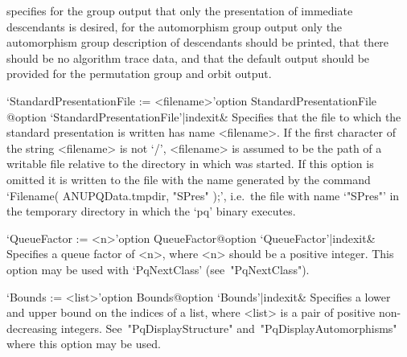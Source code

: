specifies for the group output that only the  presentation  of  immediate
descendants is desired,  for  the  automorphism  group  output  only  the
automorphism group description of descendants  should  be  printed,  that
there should be no algorithm trace data,  and  that  the  default  output
should be provided for the permutation group and orbit output.

\>`StandardPresentationFile := <filename>'{option StandardPresentationFile}%
@{option `StandardPresentationFile'|indexit}&
Specifies that the file to which the standard presentation is written has
name <filename>. If the first character of the string <filename>  is  not
`/', <filename> is assumed to be the path of a writable file relative  to
the directory in which {\GAP} was started. If this option is  omitted  it
is written to the file with the name generated by the command  `Filename(
ANUPQData.tmpdir, "SPres" );', i.e.~the file with name `"SPres"'  in  the
temporary directory in which the `pq' binary executes.

\>`QueueFactor := <n>'{option QueueFactor}@{option `QueueFactor'|indexit}&
Specifies a queue factor of <n>, where <n> should be a positive  integer.
This option may be used with `PqNextClass' (see~"PqNextClass").

\>`Bounds := <list>'{option Bounds}@{option `Bounds'|indexit}&
Specifies a lower and upper bound on the indices of a list, where  <list>
is a pair of positive non-decreasing  integers.  See~"PqDisplayStructure"
and~"PqDisplayAutomorphisms" where this option may be used.

\enditems

